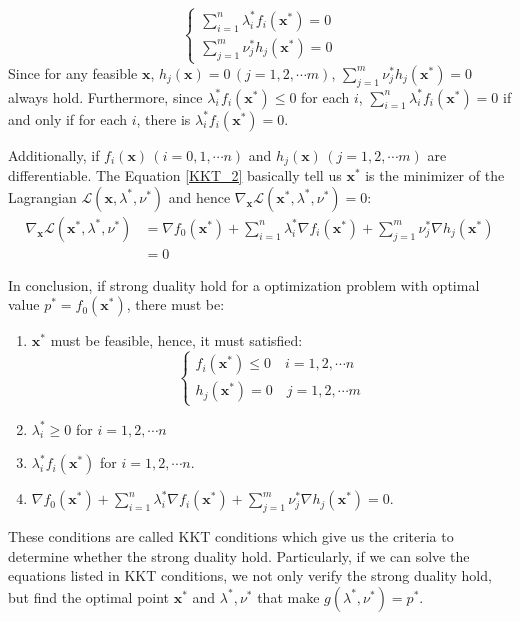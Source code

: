 \documentclass[10pt,a4paper]{article}
\begin{document}
\begin{equation}
	\begin{cases}
		\displaystyle\sum_{i = 1}^{n} \lambda^{*}_{i} f_{i}(\mathbf{x}^{*}) = 0 \\
		\displaystyle\sum_{j = 1}^{m} \nu^{*}_{j} h_{j}(\mathbf{x}^{*}) = 0
	\end{cases}
\end{equation}
Since for any feasible $\mathbf{x}$, $h_{j}(\mathbf{x}) = 0 \,(j = 1, 2, \cdots m)$, $\displaystyle\sum_{j = 1}^{m} \nu^{*}_{j} h_{j}(\mathbf{x}^{*}) = 0$ always hold. Furthermore, since $\lambda_{i}^{*} f_{i}(\mathbf{x}^{*}) \leq 0$ for each $i$, $\displaystyle\sum_{i = 1}^{n} \lambda^{*}_{i} f_{i}(\mathbf{x}^{*}) = 0$ if and only if for each $i$, there is $\lambda_{i}^{*} f_{i}(\mathbf{x}^{*}) = 0$.

Additionally, if $f_{i}(\mathbf{x}) \, (i = 0, 1, \cdots n)$ and $h_{j}(\mathbf{x}) \, (j = 1, 2, \cdots m)$ are differentiable. The Equation \ref{KKT_2} basically tell us $\mathbf{x}^{*}$ is the minimizer of the Lagrangian $\mathcal{L}(\mathbf{x}, \lambda^{*}, \nu^{*})$ and hence $\nabla_{\mathbf{x}} \mathcal{L}(\mathbf{x}^{*}, \lambda^{*}, \nu^{*}) = 0$:
\begin{equation}
	\begin{aligned}
	\nabla_{\mathbf{x}} \mathcal{L}(\mathbf{x}^{*}, \lambda^{*}, \nu^{*}) &= \nabla f_{0}(\mathbf{x}^{*}) + \displaystyle\sum_{i = 1}^{n} \lambda_{i}^{*} \nabla f_{i}(\mathbf{x}^{*}) + \displaystyle\sum_{j = 1}^{m} \nu_{j}^{*} \nabla h_{j}(\mathbf{x}^{*}) \\
	& = 0
	\end{aligned}
\end{equation}

In conclusion, if strong duality hold for a optimization problem with optimal value $p^{*} = f_{0}(\mathbf{x}^{*})$, there must be:
\begin{enumerate}
	\item $\mathbf{x}^{*}$ must be feasible, hence, it must satisfied:
		\begin{equation*}
			\begin{cases}
				f_{i}(\mathbf{x}^{*}) \leq 0 \quad i = 1, 2, \cdots n \\
				h_{j}(\mathbf{x}^{*}) = 0 \quad j = 1, 2, \cdots m
			\end{cases}
		\end{equation*}
	\item $\lambda_{i}^{*} \geq 0$ for $i = 1, 2, \cdots n$
	\item $\lambda_{i}^{*} f_{i}(\mathbf{x}^{*})$ for $i = 1, 2, \cdots n$.
	\item $\nabla f_{0}(\mathbf{x}^{*}) + \displaystyle\sum_{i = 1}^{n} \lambda_{i}^{*} \nabla f_{i}(\mathbf{x}^{*}) + \displaystyle\sum_{j = 1}^{m} \nu_{j}^{*} \nabla h_{j}(\mathbf{x}^{*}) = 0$.
\end{enumerate}
These conditions are called KKT conditions which give us the criteria to determine whether the strong duality hold. Particularly, if we can solve the equations listed in KKT conditions, we not only verify the strong duality hold, but find the optimal point $\mathbf{x}^{*}$ and $\lambda^{*}, \nu^{*}$ that make $g(\lambda^{*}, \nu^{*}) = p^{*}$.
\end{document}
